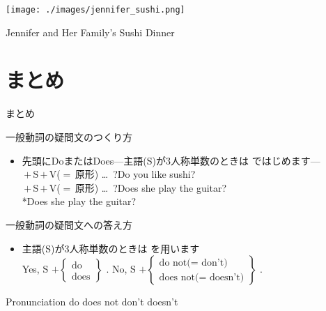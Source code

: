 \documentclass[aspectratio=169,dvipsnames]{beamer}
\begin{document}
\begin{frame}[plain]
 
\texttt{[image: ./images/jennifer\_sushi.png]}

Jennifer and Her Family's Sushi Dinner
\end{frame}
\section{まとめ}
\begin{frame}[plain]{まとめ}
 

\begin{block}{一般動詞の疑問文のつくり方}\small
\begin{itemize}[square]
 \item   先頭にDoまたはDoes\hspace{10pt}---主語(S)が3人称単数のときは\,\,ではじめます---\\
	 \,$+$\,S\,$+$\,V{\scriptsize ($=$\,原形)} \ldots\,\,\,?\hfill{}Do you like sushi?\\
	 \,$+$\,S\,$+$\,V{\scriptsize ($=$\,原形)} \ldots\,\,\,?\hfill{}Does she play the guitar?\\
\hfill{}*Does she play the guitar?
\end{itemize}
     \end{block}

\begin{block}{一般動詞の疑問文への答え方}\small
\begin{itemize}[square]
 \item 主語(S)が3人称単数のときは\,\,を用います\\
Yes, S $+ \left\{\begin{array}{l}
		  \text{do}\\
		\text{does}\end{array}\right\}$\,\,.
\hspace{20pt}
No, S $+ \left\{\begin{array}{l}
		  \text{do not($=$ don't)}\\
		\text{does not($=$ doesn't)}\end{array}\right\}$\,\,.
\end{itemize}
      \end{block}

\begin{block}{Pronunciation}
 do \hspace{15pt}does \hspace{15pt}not \hspace{15pt}don't \hspace{15pt}doesn't 
\end{block}
\end{frame}
\end{document}
